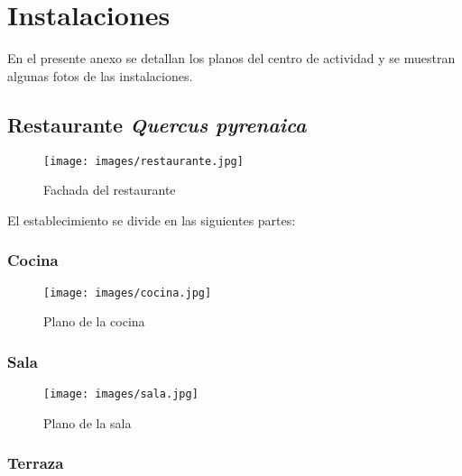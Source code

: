 \chapter{Instalaciones}
\label{chap:planos}

En el presente anexo se detallan los planos del centro de actividad y se muestran algunas fotos de las instalaciones.

\section{Restaurante \textbf{\textit{Quercus pyrenaica}}}
\label{chap:restaurante}

\begin{figure}[h!]
  \begin{center}
    \texttt{[image: images/restaurante.jpg]}
    \caption{Fachada del restaurante}
    \label{fig:restaurante}
  \end{center}
\end{figure}

El establecimiento se divide en las siguientes partes:

\subsection{Cocina}
\label{sec:restaurante:cocina}

\begin{figure}[h!]
  \begin{center}
    \texttt{[image: images/cocina.jpg]}
    \caption{Plano de la cocina}
    \label{fig:cocina}
  \end{center}
\end{figure}


\subsection{Sala}
\label{sec:restaurante:sala}

\begin{figure}[h]
  \begin{center}
    \texttt{[image: images/sala.jpg]}
    \caption{Plano de la sala}
    \label{fig:sala}
  \end{center}
\end{figure}


\subsection{Terraza}
\label{sec:restaurante:terraza}

